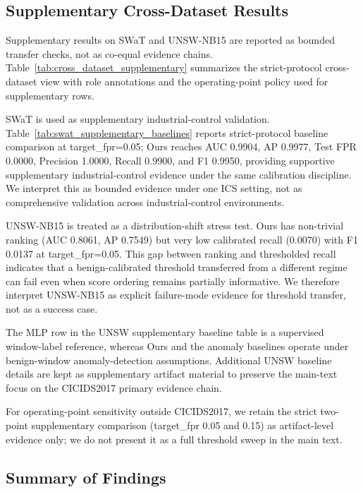 \subsection{Supplementary Cross-Dataset Results}

Supplementary results on SWaT and UNSW-NB15 are reported as bounded transfer checks, not as co-equal evidence chains. Table~\ref{tab:cross_dataset_supplementary} summarizes the strict-protocol cross-dataset view with role annotations and the operating-point policy used for supplementary rows.



SWaT is used as supplementary industrial-control validation. Table~\ref{tab:swat_supplementary_baselines} reports strict-protocol baseline comparison at target\_fpr=0.05; Ours reaches AUC 0.9904, AP 0.9977, Test FPR 0.0000, Precision 1.0000, Recall 0.9900, and F1 0.9950, providing supportive supplementary industrial-control evidence under the same calibration discipline. We interpret this as bounded evidence under one ICS setting, not as comprehensive validation across industrial-control environments.



UNSW-NB15 is treated as a distribution-shift stress test. Ours has non-trivial ranking (AUC 0.8061, AP 0.7549) but very low calibrated recall (0.0070) with F1 0.0137 at target\_fpr=0.05. This gap between ranking and thresholded recall indicates that a benign-calibrated threshold transferred from a different regime can fail even when score ordering remains partially informative. We therefore interpret UNSW-NB15 as explicit failure-mode evidence for threshold transfer, not as a success case.

The MLP row in the UNSW supplementary baseline table is a supervised window-label reference, whereas Ours and the anomaly baselines operate under benign-window anomaly-detection assumptions. Additional UNSW baseline details are kept as supplementary artifact material to preserve the main-text focus on the CICIDS2017 primary evidence chain.

For operating-point sensitivity outside CICIDS2017, we retain the strict two-point supplementary comparison (target\_fpr 0.05 and 0.15) as artifact-level evidence only; we do not present it as a full threshold sweep in the main text.

\subsection{Summary of Findings}

